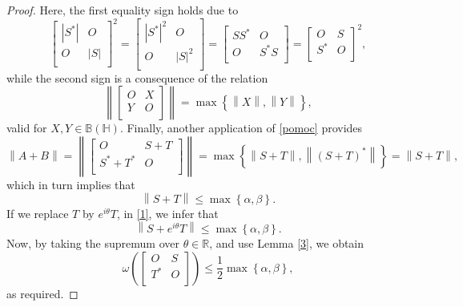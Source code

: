 \documentclass[10pt,a4paper]{amsart}
\begin{document}
\begin{proof}
Here, the first equality sign holds due to
$$
\left[ \begin{matrix}
   |S^{*}|& O  \\
   O & |S|  \\
\end{matrix} \right]^{2}=\left[ \begin{matrix}
   |S^{*}|^{2}& O  \\
   O & |S|^{2}  \\
\end{matrix} \right]=\left[ \begin{matrix}
   SS^{*}& O  \\
   O & S^{*}S  \\
\end{matrix} \right]=\left[ \begin{matrix}
   O& S  \\
   S^{*} & O  \\
\end{matrix} \right]^{2},
$$
while the second  sign is a consequence of the relation
\begin{equation}\label{pomoc}\left\| \left[ \begin{matrix}
   O & X  \\
   Y & O  \\
\end{matrix} \right] \right\|=\max \left\{ \left\| X \right\|,\left\| Y \right\| \right\},
\end{equation}
valid for $X,Y\in \mathbb B\left( \mathbb H \right)$. Finally, another application of \eqref{pomoc}
provides
$$
 \left\| A+B \right\|=\left\| \left[ \begin{matrix}
   O & S+T  \\
   {{S}^{*}}+{{T}^{*}} & O  \\
\end{matrix} \right] \right\|=\max \left\{ \left\| S+T \right\|,\left\| (S+T)^{*} \right\| \right\}=\left\| S+T \right\|,
$$
which in turn implies that
\begin{equation}\label{1}
\left\| S+T \right\|\le \max \left\{ \alpha ,\beta  \right\}.
\end{equation}
If we replace $T$ by ${{e}^{i\theta }}T$, in \eqref{1}, we infer that
\[\left\| S+{{e}^{i\theta }}T \right\|\le \max \left\{ \alpha ,\beta  \right\}.\]
Now, by taking the supremum over $\theta \in \mathbb{R}$, and use Lemma \ref{3}, we obtain
\[\omega \left( \left[ \begin{matrix}
   O & S  \\
   {{T}^{*}} & O  \\
\end{matrix} \right] \right)\le \frac{1}{2}\max \left\{ \alpha ,\beta  \right\},\]
as required.
\end{proof}
\end{document}
